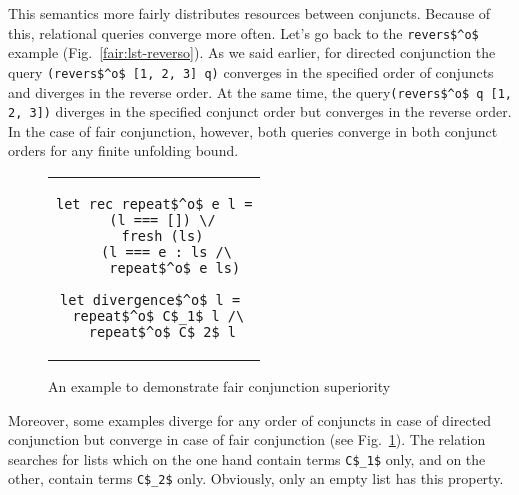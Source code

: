 This semantics more fairly distributes resources between conjuncts. Because of this, relational queries converge more often. Let's go back to the \lstinline{revers$^o$} example
(Fig.~\ref{fair:lst-reverso}). As we said earlier, for directed conjunction the query \linebreak \lstinline{(revers$^o$ [1, 2, 3] q)} converges in the specified order of conjuncts and diverges
in the reverse order. At the same time, the query\lstinline{(revers$^o$ q [1, 2, 3])} diverges in the specified conjunct order but converges in the reverse order. In the case of fair conjunction,
however, both queries converge in both conjunct orders for any finite unfolding bound.

\begin{figure}[h!]
\centering
\begin{tabular}{c}
\begin{lstlisting}
let rec repeat$^o$ e l =
  (l === []) \/
  fresh (ls)
    (l === e : ls /\ 
     repeat$^o$ e ls)
     
let divergence$^o$ l = 
  repeat$^o$ C$_1$ l /\ 
  repeat$^o$ C$_2$ l
\end{lstlisting}
\end{tabular}

\caption{An example to demonstrate fair conjunction superiority}
\label{fair:lst-repeato}
\end{figure}

Moreover, some examples diverge for any order of conjuncts in case of directed conjunction but converge in case of fair conjunction (see Fig.~\ref{fair:lst-repeato}).
The relation searches for lists which on the one hand contain terms \lstinline{C$_1$} only, and on the other, contain terms \lstinline{C$_2$} only. Obviously, only an empty list has this property.

